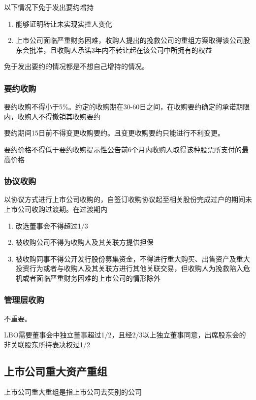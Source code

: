 \documentclass[UTF8,12pt]{ctexart}
\numberwithin{equation}{section} %
\numberwithin{figure}{section}
\numberwithin{table}{section}
\begin{document}
	以下情况下免于发出要约增持
	\begin{enumerate}
		\item 能够证明转让未实现实控人变化
		
		\item 上市公司面临严重财务困难，收购人提出的挽救公司的重组方案取得该公司股东会批准，且收购人承诺3年内不转让起在该公司中所拥有的权益
	\end{enumerate}
	
	免于发出要约的情况都是不想自己增持的情况。
	
	\subsubsection{要约收购}
	要约收购不得小于5\%。约定的收购期在30-60日之间，在收购要约确定的承诺期限内，收购人不得撤销其收购要约
	
	要约期间15日前不得变更收购要约。且变更收购要约只能进行不利变更。
	
	要约价格不得低于要约收购提示性公告前6个月内收购人取得该种股票所支付的最高价格
	
	
	
	\subsubsection{协议收购}
	以协议方式进行上市公司收购的，自签订收购协议起至相关股份完成过户的期间未上市公司收购过渡期。在过渡期内
	\begin{enumerate}
		\item 改选董事会不得超过1/3
		
		\item 被收购公司不得为收购人及其关联方提供担保
		
		\item 被收购同事不得公开发行股份募集资金，不得进行重大购买、出售资产及重大投资行为或者与收购人及其关联方进行其他关联交易，但收购人为挽救陷入危机或者面临严重财务困难的上市公司的情形除外
	\end{enumerate}
	
	\subsubsection{管理层收购}
	不重要。
	
	LBO需要董事会中独立董事超过1/2，且经2/3以上独立董事同意，出席股东会的非关联股东所持表决权过1/2
	
	\subsection{上市公司重大资产重组}
	上市公司重大重组是指上市公司去买别的公司
	
\end{document}
